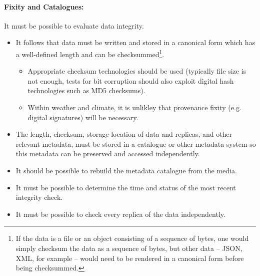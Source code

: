 \paragraph{Fixity and Catalogues:} It must be possible to evaluate data integrity.
\begin{itemize}
\item It follows that data must be written and stored in a canonical form which has a well-defined length and can be
  checksummed\footnote{If the data is a file or an object consisting of a sequence of bytes, one would simply checksum
    the data as a sequence of bytes, but other data – JSON, XML, for example – would need to be rendered in a canonical form before being checksummed.}.
  \begin{itemize}
  \item Appropriate checksum technologies should be used (typically file size
  is not enough, tests for bit corruption should also exploit digital hash
  technologies such as MD5 checksums).
  \item Within weather and climate, it is unlikley that provenance fixity
  (e.g. digital signatures) will be necessary.
  \end{itemize}
  \item The length, checksum, storage location of data and replicas, and other relevant metadata, must be stored in a catalogue or other metadata system so this metadata can be preserved and accessed independently.
  \item It should be possible to rebuild the metadata catalogue from the media.
  \item It must be possible to determine the time and status of the most recent integrity check.
  \item It must be possible to check every replica of the data independently.
  \end{itemize}

